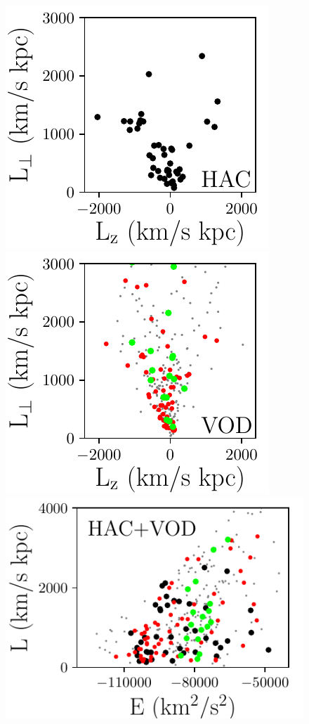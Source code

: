 \documentclass[fleqn,usenatbib]{mnras}
\begin{document}
   \begin{figure}
	        \includegraphics[scale=0.4035]{HAC_Lz_Lp.pdf}
	    \includegraphics[scale=0.4035]{VOD_Lz_Lp.pdf}
        \includegraphics[scale=0.4035]{E_L.pdf}

\end{figure}
\end{document}
